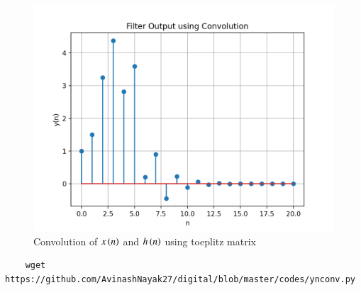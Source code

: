 \documentclass[journal,12pt,twocolumn]{IEEEtran}
\renewcommand\thesection{\arabic{section}}
\begin{document}
\begin{enumerate}[label=\thesection.\arabic*]
\begin{figure}
        \includegraphics[width = \columnwidth]{figs/ynconv.png}
        \caption{Convolution of $x\left(n\right)$ and $h\left(n\right)$ using toeplitz matrix}
        \label{5.9}
      \end{figure}
      \begin{lstlisting}
    wget https://github.com/AvinashNayak27/digital/blob/master/codes/ynconv.py
      \end{lstlisting}
    

\end{enumerate}
\end{document}
